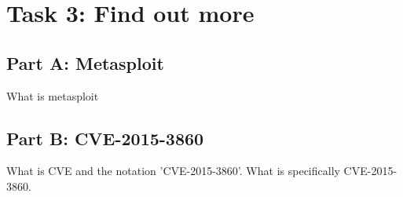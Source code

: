 \section{Task 3: Find out more}

\subsection{Part A: Metasploit}
What is metasploit

\subsection{Part B: CVE-2015-3860}
What is CVE and the notation 'CVE-2015-3860'.
What is specifically CVE-2015-3860.
